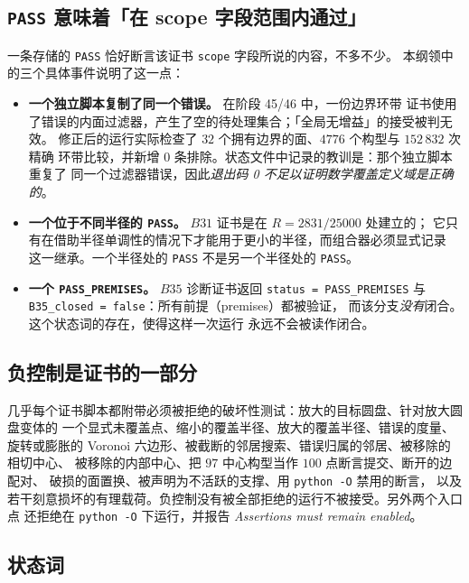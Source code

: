 \subsection{\texttt{PASS} 意味着「在 scope 字段范围内通过」}

一条存储的 \texttt{PASS} 恰好断言该证书 \texttt{scope} 字段所说的内容，不多不少。
本纲领中的三个具体事件说明了这一点：

\begin{itemize}[leftmargin=1.4em,itemsep=3pt]
\item \textbf{一个独立脚本复制了同一个错误。} 在阶段 45/46 中，一份边界环带
证书使用了错误的内面过滤器，产生了空的待处理集合；「全局无增益」的接受被判无效。
修正后的运行实际检查了 $32$ 个拥有边界的面、$4776$ 个构型与 $152\,832$ 次精确
环带比较，并新增 $0$ 条排除。状态文件中记录的教训是：那个独立脚本重复了
同一个过滤器错误，因此\emph{退出码 0 不足以证明数学覆盖定义域是正确的}。
\item \textbf{一个位于不同半径的 \texttt{PASS}。} $B31$ 证书是在 $R=2831/25000$ 处建立的；
它只有在借助半径单调性的情况下才能用于更小的半径，而组合器必须显式记录
这一继承。一个半径处的 \texttt{PASS} 不是另一个半径处的 \texttt{PASS}。
\item \textbf{一个 \texttt{PASS\_\allowbreak{}PREMISES}。} $B35$ 诊断证书返回
\texttt{status = PASS\_\allowbreak{}PREMISES} 与 \texttt{B35\_\allowbreak{}closed = false}：所有前提（premises）都被验证，
而该分支\emph{没有}闭合。这个状态词的存在，使得这样一次运行
永远不会被读作闭合。
\end{itemize}

\subsection{负控制是证书的一部分}

几乎每个证书脚本都附带必须被拒绝的破坏性测试：放大的目标圆盘、针对放大圆盘变体的
一个显式未覆盖点、缩小的覆盖半径、放大的覆盖半径、错误的度量、旋转或膨胀的
Voronoi 六边形、被截断的邻居搜索、错误归属的邻居、被移除的相切中心、
被移除的内部中心、把 $97$ 中心构型当作 $100$ 点断言提交、断开的边配对、
破损的面置换、被声明为不活跃的支撑、用 \texttt{python -\allowbreak{}O} 禁用的断言，
以及若干刻意损坏的有理载荷。负控制没有被全部拒绝的运行不被接受。另外两个入口点
还拒绝在 \texttt{python -\allowbreak{}O} 下运行，并报告 \emph{Assertions must remain enabled}。

\subsection{状态词}


